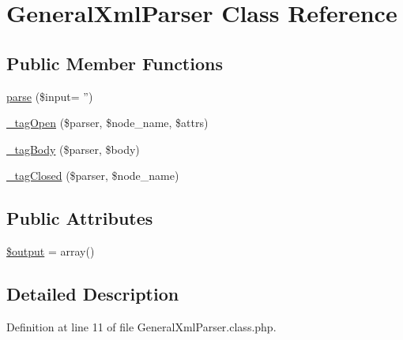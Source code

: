\hypertarget{classGeneralXmlParser}{\section{General\-Xml\-Parser Class Reference}
\label{classGeneralXmlParser}
}
\subsection*{Public Member Functions}
\begin{DoxyCompactItemize}
\item 
\hyperlink{classGeneralXmlParser_a908eec0715e2c7470a18e149a092f300}{parse} (\$input= '')
\item 
\hyperlink{classGeneralXmlParser_a2921aab91afa276ce9f6c75cf483e80d}{\-\_\-tag\-Open} (\$parser, \$node\-\_\-name, \$attrs)
\item 
\hyperlink{classGeneralXmlParser_a78c57730ac9d216ba88c02eb2f3c2903}{\-\_\-tag\-Body} (\$parser, \$body)
\item 
\hyperlink{classGeneralXmlParser_a4609e66c695acd3f1a85450228f0b79b}{\-\_\-tag\-Closed} (\$parser, \$node\-\_\-name)
\end{DoxyCompactItemize}
\subsection*{Public Attributes}
\begin{DoxyCompactItemize}
\item 
\hyperlink{classGeneralXmlParser_a33ef1b950659188b06d8586c366f8fe2}{\$output} = array()
\end{DoxyCompactItemize}


\subsection{Detailed Description}


Definition at line 11 of file General\-Xml\-Parser.\-class.\-php.



